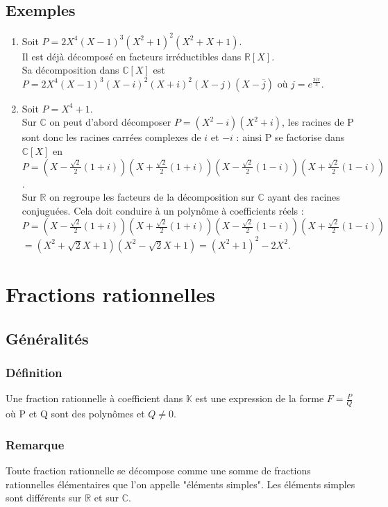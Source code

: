 \documentclass[a4paper,10pt]{book} %
\newcommand{\R}{\mathbb{R}}
\newcommand{\C}{\mathbb{C}}
\newcommand{\K}{\mathbb{K}}
\begin{document}
\subsection{Exemples}
\begin{enumerate}
\item Soit $P=2X^{4}(X-1)^{3}(X^{2}+1)^{2}(X^{2}+X+1)$.\\
Il est déjà décomposé en facteurs irréductibles dans $\R[X]$.\\
Sa décomposition dans $\C[X]$ est $P=2X^{4}(X-1)^{3}(X-i)^{2}(X+i)^{2}(X-j)(X-\overline{j})$ où $j=e^{\frac{2i\pi}{3}}$.\\

\item Soit $P=X^{4}+1$.\\
Sur $\C$ on peut d'abord décomposer $P=(X^{2}-i)(X^{2}+i)$, les racines de P sont donc les racines carrées complexes de $i$ et $-i$ : ainsi P se factorise dans $\C[X]$ en\\  $P=(X-\frac{\sqrt{2}}{2}(1+i))(X+\frac{\sqrt{2}}{2}(1+i))(X-\frac{\sqrt{2}}{2}(1-i))(X+\frac{\sqrt{2}}{2}(1-i))$.\\

Sur $\R$ on regroupe les facteurs de la décomposition sur $\C$ ayant des racines conjuguées. Cela doit conduire à un polynôme à coefficients réels :\\
$P=(X-\frac{\sqrt{2}}{2}(1+i))(X+\frac{\sqrt{2}}{2}(1+i))(X-\frac{\sqrt{2}}{2}(1-i))(X+\frac{\sqrt{2}}{2}(1-i))$\\
\hspace*{0.35cm}$=(X^{2}+\sqrt{2}X+1)(X^{2}-\sqrt{2}X+1)=(X^{2}+1)^{2}-2X^{2}$.
\end{enumerate}

\section{Fractions rationnelles}
\subsection{Généralités}
\subsubsection{Définition}
Une fraction rationnelle à coefficient dans $\K$ est une expression de la forme $F=\frac{P}{Q}$ où P et Q sont des polynômes et $Q\neq 0$.

\subsubsection{Remarque}
Toute fraction rationnelle se décompose comme une somme de fractions rationnelles élémentaires que l'on appelle "éléments simples".
Les éléments simples sont différents sur $\R$ et sur $\C$.
\end{document}
